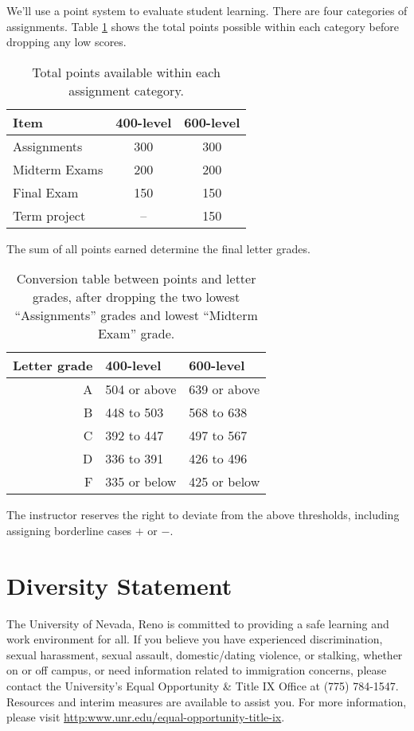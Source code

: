 \documentclass[11pt,onecolumn]{article}
\begin{document}
We'll use a point system to evaluate student learning. There are four categories of assignments. Table \ref{tab:points} shows the total points possible within each category before dropping any low scores.

\begin{table}[h]
  \begin{center}
  \begin{tabular}{l|c|c}	%
Item&400-level& 600-level\\\hline\hline
  Assignments& 300 & 300\\
  Midterm Exams& 200 & 200\\
  Final Exam& 150 & 150\\
  Term project &-- & 150 \\
  \end{tabular}
  \caption{Total points available within each assignment category. \label{tab:points}}
\end{center}

\end{table}

The sum of all points earned determine the final letter grades. 

\begin{table}[h]
\begin{center}
  \begin{tabular}{r|l|l}
    Letter grade &400-level& 600-level\\\hline\hline
A&504 or above&639 or above\\
B&448 to 503&568 to 638\\
C&392 to 447&497 to 567\\
D&336 to 391&426 to 496\\
F&335 or below&425 or below
  \end{tabular}
  \caption{Conversion table between points and letter grades, after dropping the two lowest ``Assignments'' grades and lowest ``Midterm Exam'' grade.}
\end{center}
      \label{tab:grade}
\end{table}

The instructor reserves the right to deviate from the above thresholds, including assigning borderline cases $+$ or $-$.

\section*{Diversity Statement}
The University of Nevada, Reno is committed to providing a safe learning and work environment for all. If you believe you have experienced discrimination, sexual harassment, sexual assault, domestic/dating violence, or stalking, whether on or off campus, or need information related to immigration concerns, please contact the University’s Equal Opportunity \& Title IX Office at (775) 784-1547. Resources and interim measures are available to assist you. For more information, please visit \url{http:www.unr.edu/equal-opportunity-title-ix}.
\end{document}
